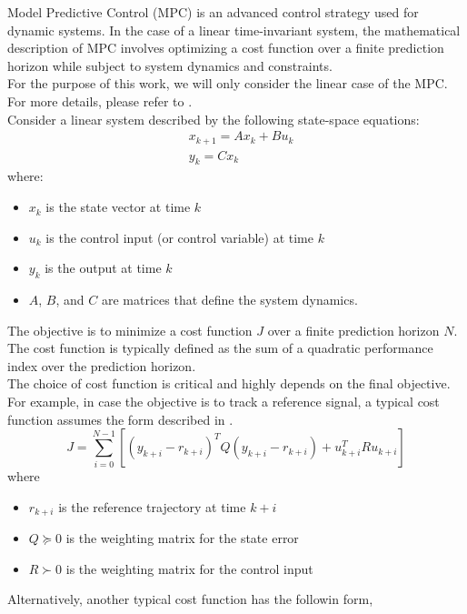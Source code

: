 Model Predictive Control (MPC) is an advanced control strategy used for dynamic systems. In the case of a linear time-invariant system, the mathematical description of MPC involves optimizing a cost function over a finite prediction horizon while subject to system dynamics and constraints. \\
For the purpose of this work, we will only consider the linear case of the MPC. For more details, please refer to \cite{rawlings2020model}. \\
Consider a linear system described by the following state-space equations:
\begin{align}
	&x_{k+1} = Ax_k + Bu_k \nonumber \\
	 &y_k = Cx_k \label{eq:linear_system}
\end{align}
where:
\begin{itemize}
	\item $x_k$ is the state vector at time $k$
	\item $u_k$ is the control input (or control variable) at time $k$
	\item $y_k$ is the output at time $k$
	\item $A$, $B$, and $C$ are matrices that define the system dynamics.
\end{itemize}
The objective is to minimize a cost function $J$ over a finite prediction horizon \(N\). The cost function is typically defined as the sum of a quadratic performance index over the prediction horizon. \\
The choice of cost function is critical and highly depends on the final objective. For example, in case the objective is to track a reference signal, a typical cost function assumes the form described in . 
\begin{equation}
	J = \sum_{i=0}^{N-1} \left[ (y_{k+i} - r_{k+i})^T Q (y_{k+i} - r_{k+i}) + u_{k+i}^T R u_{k+i} \right] 
	\label{eq:cost_f_1}
\end{equation} 
where
\begin{itemize}
	\item \(r_{k+i}\) is the reference trajectory at time \(k+i\)
	\item  $Q \succeq 0$ is the weighting matrix for the state error
	\item $R \succ 0$ is the weighting matrix for the control input
\end{itemize}
Alternatively, another typical cost function has the followin form, 

